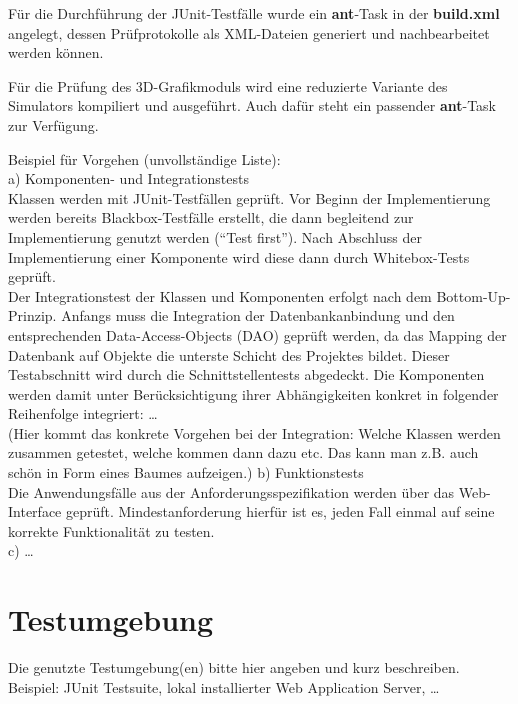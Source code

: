 Für die Durchführung der JUnit-Testfälle wurde ein \textbf{ant}-Task in der \textbf{build.xml} angelegt, dessen Prüfprotokolle als XML-Dateien generiert und nachbearbeitet werden können.

Für die Prüfung des 3D-Grafikmoduls wird eine reduzierte Variante des Simulators kompiliert und ausgeführt. Auch dafür steht ein passender \textbf{ant}-Task zur Verfügung.

Beispiel für Vorgehen (unvollständige Liste):\\
a) Komponenten- und Integrationstests\\
Klassen werden mit JUnit-Testfällen geprüft. Vor Beginn der Implementierung
werden bereits Blackbox-Testfälle erstellt, die dann begleitend zur
Implementierung genutzt werden ("`Test first"'). Nach Abschluss der
Implementierung einer Komponente wird diese dann durch Whitebox-Tests
geprüft.\\
Der Integrationstest der Klassen und Komponenten erfolgt nach dem
Bottom-Up-Prinzip. Anfangs muss die Integration der Datenbankanbindung und den
entsprechenden Data-Access-Objects (DAO) geprüft werden, da das Mapping der
Datenbank auf Objekte die unterste Schicht des Projektes bildet. Dieser
Testabschnitt wird durch die Schnittstellentests abgedeckt.
Die Komponenten werden damit unter Berücksichtigung ihrer Abhängigkeiten
konkret in folgender Reihenfolge integriert: \ldots\\
(Hier kommt das konkrete Vorgehen bei der Integration: Welche Klassen werden
zusammen getestet, welche kommen dann dazu etc. Das kann man z.B. auch schön in
Form eines Baumes aufzeigen.)
b) Funktionstests\\
Die Anwendungsfälle aus der Anforderungsspezifikation werden über das
Web-Interface geprüft. Mindestanforderung hierfür ist es, jeden Fall einmal auf
seine korrekte Funktionalität zu testen.\\
c) \ldots

\section{Testumgebung}
Die genutzte Testumgebung(en) bitte hier angeben und kurz beschreiben.\\
Beispiel: JUnit Testsuite, lokal installierter Web Application Server, \ldots

